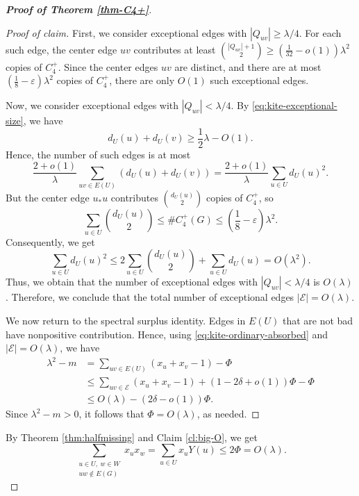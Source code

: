\documentclass[11pt,a4paper]{article}
\theoremstyle{definition}
\theoremstyle{plain}
\renewcommand{\le}{\leqslant}
\renewcommand{\ge}{\geqslant}
\begin{document}
\begin{proof}[{\bf Proof of Theorem \ref{thm-C4+}}]
\begin{proof}[Proof of claim]
First, we consider exceptional edges with \( |Q_{uv}|\ge\lambda/4\).  For each such
edge, the center edge \(uv\) contributes at least
$  {|Q_{uv}|+1\choose2}
        \ge
        \left(\frac1{32}-o(1)\right)\lambda^2$ 
copies of \(C_4^+\).  Since the center edges \(uv\) are distinct, and there are at most $(\frac{1}{8} - \varepsilon)\lambda^2$ copies of $C_4^+$, 
there are
only \(O(1)\) such exceptional edges.

Now, we consider exceptional edges with \(|Q_{uv}| <\lambda/4\).  By
\eqref{eq:kite-exceptional-size}, we have 
\[
        d_U(u)+d_U(v)\ge \frac12\lambda-O(1).
\]
Hence, the number of such edges is at most
\[
        \frac{2+o(1)}{\lambda}
        \sum_{uv\in E(U)}(d_U(u)+d_U(v))
        =
        \frac{2+o(1)}{\lambda}
        \sum_{u\in U}d_U(u)^2.
\]
But the center edge \(u_*u\) contributes \({d_U(u)\choose2}\) copies of
\(C_4^+\), so
\[
        \sum_{u\in U}{d_U(u)\choose2}\le \texttt{\#} C_4^+(G)\le \left(\frac{1}{8} - \varepsilon \right)\lambda^2.
\]
Consequently, we get 
\[
        \sum_{u\in U}d_U(u)^2
        \le
        2\sum_{u\in U}{d_U(u)\choose2} +\sum_{u\in U}d_U(u)
        =  
        O(\lambda^2).
\]
Thus, we obtain that the number of exceptional edges with \(|Q_{uv}| <\lambda/4\) is
\(O(\lambda)\).  Therefore, we conclude that the total number of exceptional edges $ |\mathcal E|=O(\lambda)$. 

We now return to the spectral surplus identity.  Edges in \(E(U)\) that are not
bad have nonpositive contribution.  Hence, using 
\eqref{eq:kite-ordinary-absorbed} and $|\mathcal E| =O(\lambda)$, we have 
\[
\begin{aligned}
        \lambda^2-m
        &=
        \sum_{uv\in E(U)}(x_u+x_v-1)-\Phi                         \\
        &\le
        \sum_{uv\in\mathcal E}(x_u+x_v-1)
        +(1-2\delta+o(1))\Phi-\Phi                                \\
        &\le
        O(\lambda)-(2\delta-o(1))\Phi.
\end{aligned}
\]
Since \(\lambda^2-m>0\), it follows that
$\Phi=O(\lambda)$, as needed. 
\end{proof}

By Theorem \ref{thm:halfmissing} and Claim \ref{cl:big-O}, we get
\begin{equation}\label{eq:kite-missing-Olambda}
        \sum_{\substack{u\in U,\ w\in W\\ uw\notin E(G)}}x_ux_w
        =
        \sum_{u\in U}x_uY(u)
        \le 2\Phi =
        O(\lambda).
\end{equation}



\end{proof}
\end{document}
